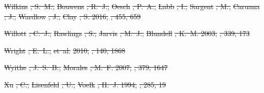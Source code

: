 \documentclass[numberedappendix]{emulateapj}
\providecommand{\DIFdel}[1]{{\protect\color{red}\sout{#1}}}                      %
\begin{document}
\DIFdel{Wilkins}%
\DIFdel{, S.~M., }%
\DIFdel{Bouwens}%
\DIFdel{, R.~J., }%
\DIFdel{Oesch}%
\DIFdel{, P.~A., }%
\DIFdel{Labb}%
\DIFdel{, I., }%
\DIFdel{Sargent}%
\DIFdel{,
  M., }%
\DIFdel{Caruana}%
\DIFdel{, J., }%
\DIFdel{Wardlow}%
\DIFdel{, J., }%
\DIFdel{Clay}%
\DIFdel{, S. 2016, }%
\DIFdel{, 455, 659
}%

\DIFdel{Willott}%
\DIFdel{, C.~J., }%
\DIFdel{Rawlings}%
\DIFdel{, S., }%
\DIFdel{Jarvis}%
\DIFdel{, M.~J., }%
\DIFdel{Blundell}%
\DIFdel{, K.~M. 2003,
  }%
\DIFdel{, 339, 173
}%

\DIFdel{Wright}%
\DIFdel{, E.~L., }%
\DIFdel{et~al.}%
\DIFdel{2010, }%
\DIFdel{, 140, 1868
}%

\DIFdel{Wyithe}%
\DIFdel{, J.~S.~B., }%
\DIFdel{Morales}%
\DIFdel{, M.~F. 2007, }%
\DIFdel{, 379, 1647
}%

\DIFdel{Xu}%
\DIFdel{, C., }%
\DIFdel{Lisenfeld}%
\DIFdel{, U., }%
\DIFdel{Voelk}%
\DIFdel{, H.~J. 1994, }%
\DIFdel{, 285, 19
}%
\end{document}
